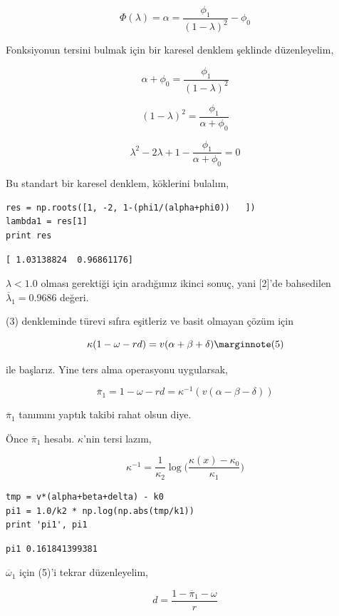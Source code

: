 \documentclass[12pt,fleqn]{article}\usepackage{../../common}
\begin{document}
$$ \Phi(\lambda) = \alpha = \frac{\phi_1}{(1-\lambda)^2}-\phi_0$$

Fonksiyonun tersini bulmak için bir karesel denklem şeklinde düzenleyelim,

$$ \alpha + \phi_0 = \frac{\phi_1}{(1-\lambda)^2}$$

$$   (1-\lambda)^2 = \frac{\phi_1}{ \alpha + \phi_0} $$

$$  \lambda^2 - 2\lambda + 1 - \frac{\phi_1}{ \alpha + \phi_0} =0$$

Bu standart bir karesel denklem, köklerini bulalım,

\begin{verbatim}
res = np.roots([1, -2, 1-(phi1/(alpha+phi0))   ])
lambda1 = res[1]
print res
\end{verbatim}

\begin{verbatim}
[ 1.03138824  0.96861176]
\end{verbatim}

$\lambda < 1.0$ olması gerektiği için aradığımız ikinci sonuç, yani [2]'de
bahsedilen $\overline{\lambda}_1 = 0.9686$ değeri.

(3) denkleminde türevi sıfıra eşitleriz ve basit olmayan çözüm için

$$ 
\kappa(1-\omega-rd)= v (\alpha + \beta + \delta) 
\mlabel{5}
$$

ile başlarız. Yine ters alma operasyonu uygularsak,

$$ \overline{\pi}_1 = 1-\omega-rd= \kappa^{-1}(v (\alpha - \beta - \delta)) $$

$\overline{\pi}_1$ tanımını yaptık takibi rahat olsun diye. 

Önce $\overline{\pi}_1$ hesabı. $\kappa$'nin tersi lazım,

$$ \kappa^{-1} = \frac{1}{\kappa_2} \log \bigg( \frac{\kappa(x) - \kappa_0 }{\kappa_1}\bigg)$$

\begin{verbatim}
tmp = v*(alpha+beta+delta) - k0
pi1 = 1.0/k2 * np.log(np.abs(tmp/k1))
print 'pi1', pi1
\end{verbatim}

\begin{verbatim}
pi1 0.161841399381
\end{verbatim}

$\overline{\omega}_1$ için (5)'i tekrar düzenleyelim,

$$ d = \frac{1-\overline{\pi}_1-\omega}{r} $$
\end{document}
